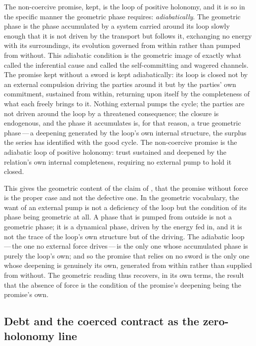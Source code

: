 The non-coercive promise, kept, is the loop of positive holonomy, and it is so in the specific manner the geometric phase requires: \emph{adiabatically}. The geometric phase is the phase accumulated by a system carried around its loop slowly enough that it is not driven by the transport but follows it, exchanging no energy with its surroundings, its evolution governed from within rather than pumped from without. This adiabatic condition is the geometric image of exactly what  called the inferential cause and  called the self-committing and wagered channels. The promise kept without a sword is kept adiabatically: its loop is closed not by an external compulsion driving the parties around it but by the parties' own commitment, sustained from within, returning upon itself by the completeness of what each freely brings to it. Nothing external pumps the cycle; the parties are not driven around the loop by a threatened consequence; the closure is endogenous, and the phase it accumulates is, for that reason, a true geometric phase\,---\,a deepening generated by the loop's own internal structure, the surplus the series has identified with the good cycle. The non-coercive promise is the adiabatic loop of positive holonomy: trust sustained and deepened by the relation's own internal completeness, requiring no external pump to hold it closed.

This gives the geometric content of the claim of , that the promise without force is the proper case and not the defective one. In the geometric vocabulary, the want of an external pump is not a deficiency of the loop but the condition of its phase being geometric at all. A phase that is pumped from outside is not a geometric phase; it is a dynamical phase, driven by the energy fed in, and it is not the trace of the loop's own structure but of the driving. The adiabatic loop\,---\,the one no external force drives\,---\,is the only one whose accumulated phase is purely the loop's own; and so the promise that relies on no sword is the only one whose deepening is genuinely its own, generated from within rather than supplied from without. The geometric reading thus recovers, in its own terms, the result that the absence of force is the condition of the promise's deepening being the promise's own.

\subsection{Debt and the coerced contract as the zero-holonomy line}
\label{p13:sub:holo-debt}

